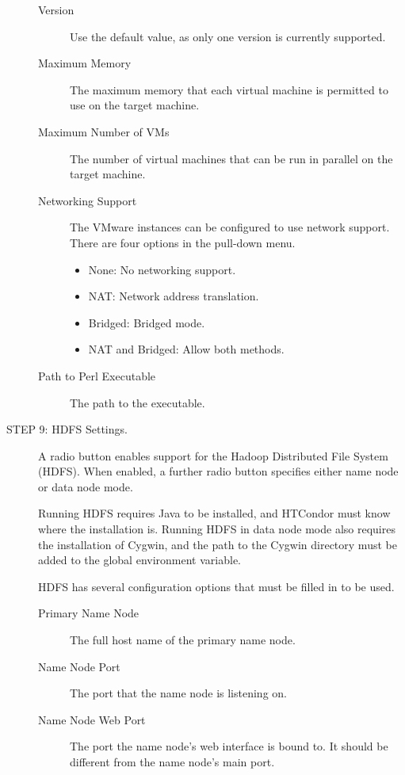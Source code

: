 \begin{description}
     \begin{description}
     \item[Version]
     Use the default value, as only one version is currently supported.
     \item[Maximum Memory]
     The maximum memory that each virtual machine is permitted to use 
     on the target machine.
     \item[Maximum Number of VMs]
     The number of virtual machines that can be run in parallel 
     on the target machine.
     \item[Networking Support]
     The VMware instances can be configured to use network support.
     There are four options in the pull-down menu.
          \begin{itemize}
          \item None: No networking support.
          \item NAT: Network address translation.
          \item Bridged: Bridged mode.
          \item NAT and Bridged: Allow both methods.
          \end{itemize}
     \item[Path to Perl Executable]
     The path to the  executable.
     \end{description}

\item[STEP 9: HDFS Settings.]
     A radio button enables support for 
     the Hadoop Distributed File System (HDFS).
     When enabled, a further radio button specifies 
     either name node or data node mode.

     Running HDFS requires Java to be installed,
     and HTCondor must know where the installation is.
     Running HDFS in data node mode also requires the installation of Cygwin,
     and the path to the Cygwin directory must be added to the 
     global  environment variable.

     HDFS has several configuration options that must be filled in to be used.
     \begin{description}
     \item[Primary Name Node]
     The full host name of the primary name node.
     \item[Name Node Port]
     The port that the name node is listening on.
     \item[Name Node Web Port]
     The port the name node's web interface is bound to.
     It should be different from the name node's main port.
     \end{description}


\end{description}
